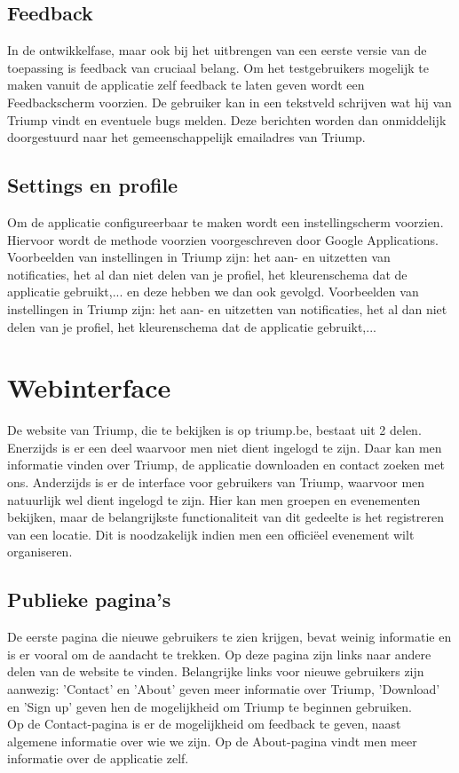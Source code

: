\subsection{Feedback}%
In de ontwikkelfase, maar ook bij het uitbrengen van een eerste versie van de toepassing is feedback van cruciaal belang. Om het testgebruikers mogelijk te maken vanuit de applicatie zelf feedback te laten geven wordt een Feedbackscherm voorzien. De gebruiker kan in een tekstveld schrijven wat hij van Triump vindt en eventuele bugs melden. Deze berichten worden dan onmiddelijk doorgestuurd naar het gemeenschappelijk emailadres van Triump.
\subsection{Settings en profile}%
Om de applicatie configureerbaar te maken wordt een instellingscherm voorzien. Hiervoor wordt de methode voorzien voorgeschreven door Google Applications.
Voorbeelden van instellingen in Triump zijn: het aan- en uitzetten van notificaties, het al dan niet delen van je profiel, het kleurenschema dat de applicatie gebruikt,...
en deze hebben we dan ook gevolgd. Voorbeelden van instellingen in Triump zijn: het aan- en uitzetten van notificaties, het al dan niet delen van je profiel, het kleurenschema dat de applicatie gebruikt,...



\section{Webinterface}%
De website van Triump, die te bekijken is op triump.be, bestaat uit 2 delen. Enerzijds is er een deel waarvoor men niet dient ingelogd te zijn. Daar kan men informatie vinden over Triump, de applicatie downloaden en contact zoeken met ons. Anderzijds is er de interface voor gebruikers van Triump, waarvoor men natuurlijk wel dient ingelogd te zijn. Hier kan men groepen en evenementen bekijken, maar de belangrijkste functionaliteit van dit gedeelte is het registreren van een locatie. Dit is noodzakelijk indien men een officiëel evenement wilt organiseren.
\subsection{Publieke pagina's}
De eerste pagina die nieuwe gebruikers te zien krijgen, bevat weinig informatie en is er vooral om de aandacht te trekken. Op deze pagina zijn links naar andere delen van de website te vinden. Belangrijke links voor nieuwe gebruikers zijn aanwezig: 'Contact' en 'About' geven meer informatie over Triump, 'Download' en 'Sign up' geven hen de mogelijkheid om Triump te beginnen gebruiken.\\
Op de Contact-pagina is er de mogelijkheid om feedback te geven, naast algemene informatie over wie we zijn.
Op de About-pagina vindt men meer informatie over de applicatie zelf.
